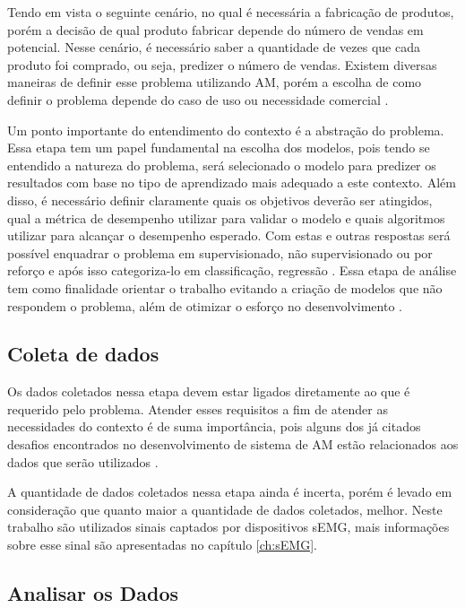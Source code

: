 Tendo em vista o seguinte cenário, no qual é necessária a fabricação de produtos, porém a decisão de qual produto fabricar depende do número de vendas em potencial. Nesse cenário, é necessário saber a quantidade de vezes que cada produto foi comprado, ou seja, predizer o número de vendas. Existem diversas maneiras de definir esse problema utilizando AM, porém a escolha de como definir o problema depende do caso de uso ou necessidade comercial \cite{Amazon}.

Um ponto importante do entendimento do contexto é a abstração do problema. Essa etapa tem um papel fundamental na escolha dos modelos, pois tendo se entendido a natureza do problema, será selecionado o modelo para predizer os resultados com base no tipo de aprendizado mais adequado a este contexto. Além disso, é necessário definir claramente quais os objetivos deverão ser atingidos, qual a métrica de desempenho utilizar para validar o modelo e quais algoritmos utilizar para alcançar o desempenho esperado. Com estas e outras respostas será possível enquadrar o problema em supervisionado, não supervisionado ou por reforço e após isso categoriza-lo em classificação, regressão \cite{geron2017hands}. Essa etapa de análise tem como finalidade orientar o trabalho evitando a criação de modelos que não respondem o problema, além de otimizar o esforço no desenvolvimento \cite{Amazon}.

\subsection{Coleta de dados}

Os dados coletados nessa etapa devem estar ligados diretamente ao que é requerido pelo problema. Atender esses requisitos a fim de atender as necessidades do contexto é de suma importância, pois alguns dos já citados desafios encontrados no desenvolvimento de sistema de AM estão relacionados aos dados que serão utilizados \cite{geron2017hands}.

A quantidade de dados coletados nessa etapa ainda é incerta, porém é levado em consideração que quanto maior a quantidade de dados coletados, melhor. Neste trabalho são utilizados sinais captados por dispositivos sEMG, mais informações sobre esse sinal são apresentadas no capítulo \ref{ch:sEMG}.

\subsection{Analisar os Dados}

